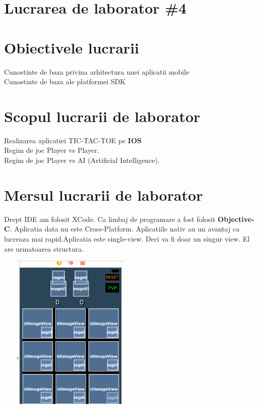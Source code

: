 \section*{Lucrarea de laborator \#4}

\section{Obiectivele lucrarii}
Cunostinte de baza privina arhitectura unei aplicatii mobile
~\\
Cunostinte de baza ale platformei SDK

\section{Scopul lucrarii de laborator}
Realizarea aplicatiei TIC-TAC-TOE pe \textbf{IOS}
~\\
Regim de joc Player vs Player.
~\\
Regim de joc Player vs AI (Artificial Intelligence).

\section{Mersul lucrarii de laborator}

\tab Drept IDE am folosit XCode. Ca limbaj de programare a fost folosit
\textbf{Objective-C}. Aplicatia data nu este Cross-Platform. Aplicatiile
nativ au un avantaj ca lucreaza mai rapid.Aplicatia este single-view. Deci va fi doar un singur view.
El are urmatoarea structura.
~\\
\begin{center} 
\includegraphics[width=7cm, height=7.5cm]{1.eps}
\end{center}
\clearpage


